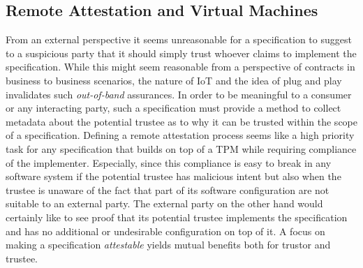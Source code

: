 \subsection{Remote Attestation and Virtual Machines}
From an external perspective it seems unreasonable for a specification to suggest to a suspicious party that it should simply trust whoever claims to implement the specification. While this might seem reasonable from a perspective of contracts in business to business scenarios, the nature of IoT and the idea of plug and play invalidates such \emph{out-of-band} assurances. In order to be meaningful to a consumer or any interacting party, such a specification must provide a method to collect metadata about the potential trustee as to why it can be trusted within the scope of a specification. Defining a remote attestation process seems like a high priority task for any specification that builds on top of a TPM while requiring compliance of the implementer. Especially, since this compliance is easy to break in any software system if the potential trustee has malicious intent but also when the trustee is unaware of the fact that part of its software configuration are not suitable to an external party. The external party on the other hand would certainly like to see proof that its potential trustee implements the specification and has no additional or undesirable configuration on top of it. A focus on making a specification \emph{attestable} yields mutual benefits both for trustor and trustee.






